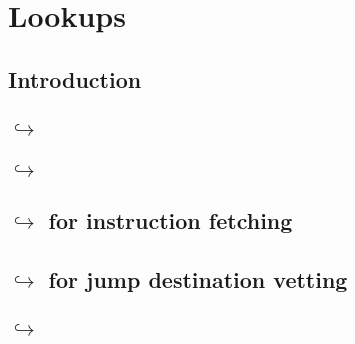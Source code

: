 

\section{Lookups \lispWip{}}
\subsection{Introduction                                                                                    \lispNone{} } \label{hub: lookups: intro}                                 
\subsection{\hubMod{} $\hookrightarrow$ \userTxnDataMod{}                                                   \lispTodo{} } \label{hub: lookups: into user txn data}                    
\subsection{\hubMod{} $\hookrightarrow$ \rlpTxnMod{}                                                        \lispDone{} } \label{hub: lookups: into rlpTxn}                           
\subsection{\hubMod{} $\hookrightarrow$ \romMod{} for instruction fetching                                  \lispDone{} } \label{hub: lookups: into rom: instruction fetching}        
\subsection{\hubMod{} $\hookrightarrow$ \romMod{} for jump destination vetting                              \lispDone{} } \label{hub: lookups: into rom: jump destination vetting}    
\subsection{\hubMod{} $\hookrightarrow$ \romLexMod{}                                                        \lispDone{} } \label{hub: lookups: into romLex}                           

